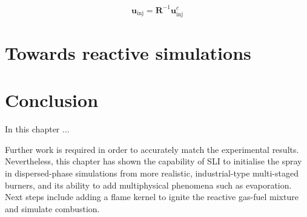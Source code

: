\begin{equation}
\boldsymbol{u}_\mathrm{inj} = \boldsymbol{R}^{-1} \boldsymbol{u}_\mathrm{inj}^c
\end{equation}

\section{Towards reactive simulations}



\section{Conclusion}

In this chapter ...

Further work is required in order to accurately match the experimental results. Nevertheless, this chapter has shown the capability of SLI to initialise the spray in dispersed-phase simulations from more realistic, industrial-type multi-staged burners, and its ability to add multiphysical phenomena such as evaporation. Next steps include adding a flame kernel to ignite the reactive gas-fuel mixture and simulate combustion.